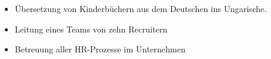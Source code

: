 \documentclass[10pt,a4paper,ragged2e,withhyper]{altacv}
\begin{document}
\begin{paracol}{2}


\begin{itemize}
  \item Übersetzung von Kinderbüchern aus dem Deutschen ins Ungarische.
\end{itemize}

\divider

\begin{itemize}
  \item Leitung eines Teams von zehn Recruitern
\end{itemize}

\divider

\begin{itemize}
  \item Betreuung aller HR-Prozesse im Unternehmen
\end{itemize}



\end{paracol}
\end{document}
